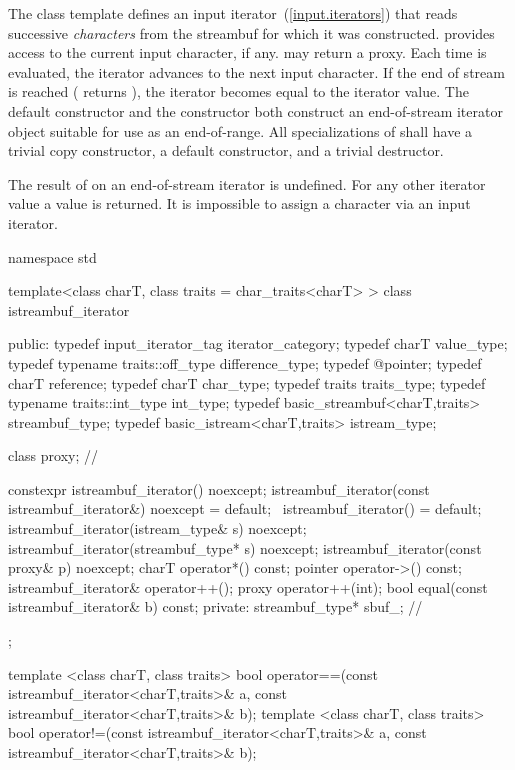 \pnum
The
class template
defines an input iterator~(\ref{input.iterators}) that
reads successive
\textit{characters}
from the streambuf for which it was constructed.
provides access to the current input character, if any.
\enternote {} may return a proxy. \exitnote
Each time
is evaluated, the iterator advances to the next input character.
If the end of stream is reached ( returns
),
the iterator becomes equal to the
iterator value.
The default constructor
and the constructor
both construct an end-of-stream iterator object suitable for use
as an end-of-range.
All specializations of  shall have a trivial copy
constructor, a  default constructor, and a trivial destructor.

\pnum
The result of
on an end-of-stream iterator is undefined.
%
For any other iterator value a
value is returned.
It is impossible to assign a character via an input iterator.

%
\begin{codeblock}
namespace std {
  template<class charT, class traits = char_traits<charT> >
  class istreambuf_iterator {
  public:
    typedef input_iterator_tag            iterator_category;
    typedef charT                         value_type;
    typedef typename traits::off_type     difference_type;
    typedef @\unspecnc@                   pointer;
    typedef charT                         reference;
    typedef charT                         char_type;
    typedef traits                        traits_type;
    typedef typename traits::int_type     int_type;
    typedef basic_streambuf<charT,traits> streambuf_type;
    typedef basic_istream<charT,traits>   istream_type;

    class proxy;                          // \expos

    constexpr istreambuf_iterator() noexcept;
    istreambuf_iterator(const istreambuf_iterator&) noexcept = default;
    ~istreambuf_iterator() = default;
    istreambuf_iterator(istream_type& s) noexcept;
    istreambuf_iterator(streambuf_type* s) noexcept;
    istreambuf_iterator(const proxy& p) noexcept;
    charT operator*() const;
    pointer operator->() const;
    istreambuf_iterator& operator++();
    proxy operator++(int);
    bool equal(const istreambuf_iterator& b) const;
  private:
    streambuf_type* sbuf_;                // \expos
  };

  template <class charT, class traits>
    bool operator==(const istreambuf_iterator<charT,traits>& a,
            const istreambuf_iterator<charT,traits>& b);
  template <class charT, class traits>
    bool operator!=(const istreambuf_iterator<charT,traits>& a,
            const istreambuf_iterator<charT,traits>& b);
}
\end{codeblock}

